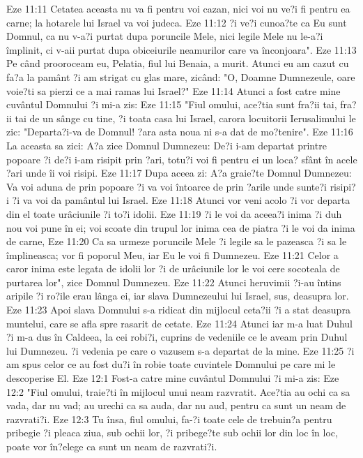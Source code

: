 Eze 11:11  Cetatea aceasta nu va fi pentru voi cazan, nici voi nu ve?i fi pentru ea carne; la hotarele lui Israel va voi judeca.
Eze 11:12  ?i ve?i cunoa?te ca Eu sunt Domnul, ca nu v-a?i purtat dupa poruncile Mele, nici legile Mele nu le-a?i împlinit, ci v-aii purtat dupa obiceiurile neamurilor care va înconjoara".
Eze 11:13  Pe când prooroceam eu, Pelatia, fiul lui Benaia, a murit. Atunci eu am cazut cu fa?a la pamânt ?i am strigat cu glas mare, zicând: "O, Doamne Dumnezeule, oare voie?ti sa pierzi ce a mai ramas lui Israel?"
Eze 11:14  Atunci a fost catre mine cuvântul Domnului ?i mi-a zis:
Eze 11:15  "Fiul omului, ace?tia sunt fra?ii tai, fra?ii tai de un sânge cu tine, ?i toata casa lui Israel, carora locuitorii Ierusalimului le zic: "Departa?i-va de Domnul! ?ara asta noua ni s-a dat de mo?tenire".
Eze 11:16  La aceasta sa zici: A?a zice Domnul Dumnezeu: De?i i-am departat printre popoare ?i de?i i-am risipit prin ?ari, totu?i voi fi pentru ei un loca? sfânt în acele ?ari unde îi voi risipi.
Eze 11:17  Dupa aceea zi: A?a graie?te Domnul Dumnezeu: Va voi aduna de prin popoare ?i va voi întoarce de prin ?arile unde sunte?i risipi?i ?i va voi da pamântul lui Israel.
Eze 11:18  Atunci vor veni acolo ?i vor departa din el toate urâciunile ?i to?i idolii.
Eze 11:19  ?i le voi da aceea?i inima ?i duh nou voi pune în ei; voi scoate din trupul lor inima cea de piatra ?i le voi da inima de carne,
Eze 11:20  Ca sa urmeze poruncile Mele ?i legile sa le pazeasca ?i sa le împlineasca; vor fi poporul Meu, iar Eu le voi fi Dumnezeu.
Eze 11:21  Celor a caror inima este legata de idolii lor ?i de urâciunile lor le voi cere socoteala de purtarea lor", zice Domnul Dumnezeu.
Eze 11:22  Atunci heruvimii ?i-au întins aripile ?i ro?ile erau lânga ei, iar slava Dumnezeului lui Israel, sus, deasupra lor.
Eze 11:23  Apoi slava Domnului s-a ridicat din mijlocul ceta?ii ?i a stat deasupra muntelui, care se afla spre rasarit de cetate.
Eze 11:24  Atunci iar m-a luat Duhul ?i m-a dus în Caldeea, la cei robi?i, cuprins de vedeniile ce le aveam prin Duhul lui Dumnezeu. ?i vedenia pe care o vazusem s-a departat de la mine.
Eze 11:25  ?i am spus celor ce au fost du?i în robie toate cuvintele Domnului pe care mi le descoperise El.
Eze 12:1  Fost-a catre mine cuvântul Domnului ?i mi-a zis:
Eze 12:2  "Fiul omului, traie?ti în mijlocul unui neam razvratit. Ace?tia au ochi ca sa vada, dar nu vad; au urechi ca sa auda, dar nu aud, pentru ca sunt un neam de razvrati?i.
Eze 12:3  Tu însa, fiul omului, fa-?i toate cele de trebuin?a pentru pribegie ?i pleaca ziua, sub ochii lor, ?i pribege?te sub ochii lor din loc în loc, poate vor în?elege ca sunt un neam de razvrati?i.
